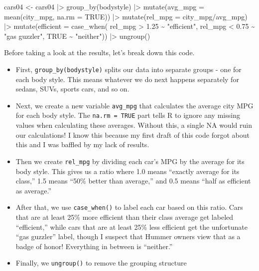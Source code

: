 \documentclass[
  letterpaper,
]{book}
\newenvironment{Shaded}{\begin{snugshade}}{\end{snugshade}}
\newcommand{\AttributeTok}[1]{\textcolor[rgb]{0.40,0.45,0.13}{#1}}
\newcommand{\ConstantTok}[1]{\textcolor[rgb]{0.56,0.35,0.01}{#1}}
\newcommand{\FloatTok}[1]{\textcolor[rgb]{0.68,0.00,0.00}{#1}}
\newcommand{\FunctionTok}[1]{\textcolor[rgb]{0.28,0.35,0.67}{#1}}
\newcommand{\NormalTok}[1]{\textcolor[rgb]{0.00,0.23,0.31}{#1}}
\newcommand{\OtherTok}[1]{\textcolor[rgb]{0.00,0.23,0.31}{#1}}
\newcommand{\SpecialCharTok}[1]{\textcolor[rgb]{0.37,0.37,0.37}{#1}}
\newcommand{\StringTok}[1]{\textcolor[rgb]{0.13,0.47,0.30}{#1}}
\begin{document}
\begin{Shaded}
\begin{Highlighting}[]
\NormalTok{cars04 }\OtherTok{\textless{}{-}}\NormalTok{ cars04 }\SpecialCharTok{|\textgreater{}} 
  \FunctionTok{group\_by}\NormalTok{(bodystyle) }\SpecialCharTok{|\textgreater{}} 
  \FunctionTok{mutate}\NormalTok{(}\AttributeTok{avg\_mpg =} \FunctionTok{mean}\NormalTok{(city\_mpg, }\AttributeTok{na.rm =} \ConstantTok{TRUE}\NormalTok{)) }\SpecialCharTok{|\textgreater{}} 
  \FunctionTok{mutate}\NormalTok{(}\AttributeTok{rel\_mpg =}\NormalTok{ city\_mpg}\SpecialCharTok{/}\NormalTok{avg\_mpg) }\SpecialCharTok{|\textgreater{}} 
  \FunctionTok{mutate}\NormalTok{(}\AttributeTok{efficient =} \FunctionTok{case\_when}\NormalTok{(}
\NormalTok{    rel\_mpg }\SpecialCharTok{\textgreater{}} \FloatTok{1.25} \SpecialCharTok{\textasciitilde{}} \StringTok{"efficient"}\NormalTok{,}
\NormalTok{    rel\_mpg }\SpecialCharTok{\textless{}} \FloatTok{0.75} \SpecialCharTok{\textasciitilde{}} \StringTok{"gas guzzler"}\NormalTok{,}
    \ConstantTok{TRUE} \SpecialCharTok{\textasciitilde{}} \StringTok{"neither"}\NormalTok{)) }\SpecialCharTok{|\textgreater{}} 
  \FunctionTok{ungroup}\NormalTok{() }
\end{Highlighting}
\end{Shaded}

Before taking a look at the results, let's break down this code.

\begin{itemize}
\item
  First, \texttt{group\_by(bodystyle)} splits our data into separate
  groups - one for each body style. This means whatever we do next
  happens separately for sedans, SUVs, sports cars, and so on.
\item
  Next, we create a new variable \texttt{avg\_mpg} that calculates the
  average city MPG for each body style. The \texttt{na.rm\ =\ TRUE} part
  tells R to ignore any missing values when calculating these averages.
  Without this, a single NA would ruin our calculations! I know this
  because my first draft of this code forgot about this and I was
  baffled by my lack of results.
\item
  Then we create \texttt{rel\_mpg} by dividing each car's MPG by the
  average for its body style. This gives us a ratio where 1.0 means
  ``exactly average for its class,'' 1.5 means ``50\% better than
  average,'' and 0.5 means ``half as efficient as average.''
\item
  After that, we use \texttt{case\_when()} to label each car based on
  this ratio. Cars that are at least 25\% more efficient than their
  class average get labeled ``efficient,'' while cars that are at least
  25\% less efficient get the unfortunate ``gas guzzler'' label, though
  I suspect that Hummer owners view that as a badge of honor! Everything
  in between is ``neither.''
\item
  Finally, we \texttt{ungroup()} to remove the grouping structure
\end{itemize}
\end{document}
